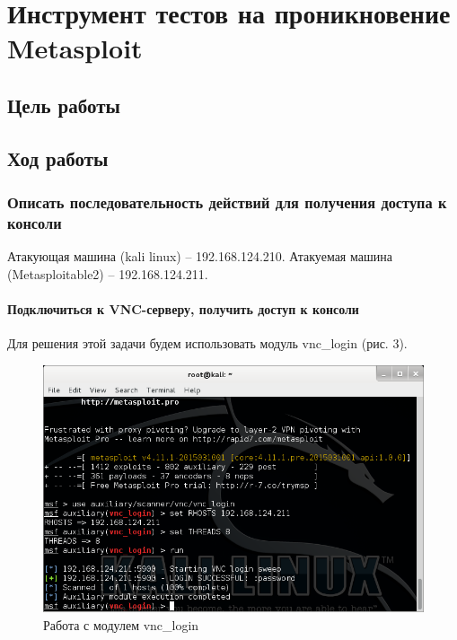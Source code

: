 \newpage
\section{Инструмент тестов на проникновение Metasploit}

\subsection{Цель работы}

\subsection{Ход работы}

\subsubsection{Описать последовательность действий для получения доступа к консоли}

Атакующая машина (kali linux) -- 192.168.124.210.
Атакуемая машина (Metasploitable2) -- 192.168.124.211.

\paragraph{Подключиться к VNC-серверу, получить доступ к консоли}




Для решения этой задачи будем использовать модуль vnc\_login (рис. 3).

\begin{figure}[h!]
\centering
\includegraphics[scale=0.9]{res/pic03}
\caption{Работа с модулем vnc\_login}
\end{figure}

